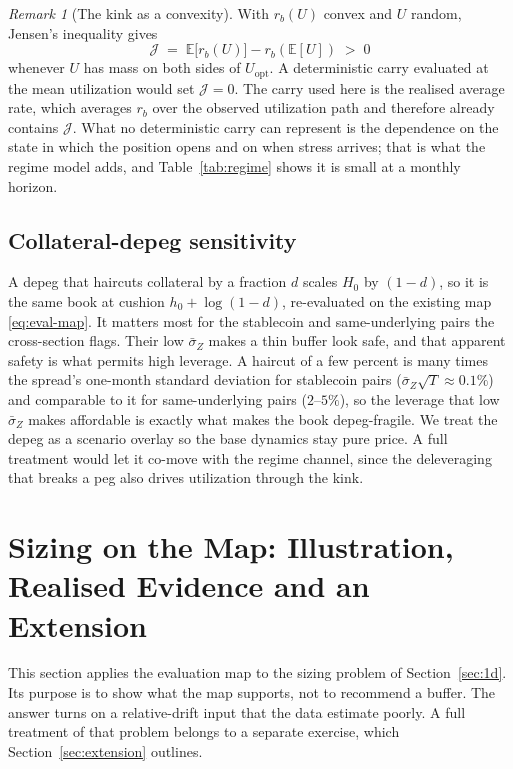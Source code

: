 \documentclass[11pt]{article}
\newcommand{\E}{\mathbb{E}}
\theoremstyle{plain}
\theoremstyle{definition}
\theoremstyle{remark}
\newtheorem{remark}{Remark}
\begin{document}
\begin{remark}[The kink as a convexity]\label{rem:jensen}
With $r_b(U)$ convex and $U$ random, Jensen's inequality gives
\begin{equation}\label{eq:jensen}
\mathcal J\;=\;\E\!\big[r_b(U)\big]-r_b(\E[U])\;>\;0
\end{equation}
whenever $U$ has mass on both sides of $U_{\mathrm{opt}}$. A deterministic carry evaluated at the
mean utilization would set $\mathcal J=0$. The carry used here is the realised average rate, which
averages $r_b$ over the observed utilization path and therefore already contains $\mathcal J$. What
no deterministic carry can represent is the dependence on the state in which the position opens and
on when stress arrives; that is what the regime model adds, and Table~\ref{tab:regime} shows it is
small at a monthly horizon.
\end{remark}

\subsection{Collateral-depeg sensitivity}\label{sec:carry-depeg}
A depeg that haircuts collateral by a fraction $d$ scales $H_0$ by $(1-d)$, so it is the same book at
cushion $h_0+\log(1-d)$, re-evaluated on the existing map \eqref{eq:eval-map}. It matters most for
the stablecoin and same-underlying pairs the cross-section flags. Their low $\bar\sigma_Z$ makes a
thin buffer look safe, and that apparent safety is what permits high leverage. A haircut of a few
percent is many times the spread's one-month standard deviation for stablecoin pairs
($\bar\sigma_Z\sqrt T\approx0.1\%$) and comparable to it for same-underlying pairs ($2$--$5\%$),
so the leverage that low $\bar\sigma_Z$ makes affordable is exactly what makes the book
depeg-fragile. We
treat the depeg as a scenario overlay so the base dynamics stay pure price. A full treatment would let
it co-move with the regime channel, since the deleveraging that breaks a peg also drives utilization
through the kink.

\section{Sizing on the Map: Illustration, Realised Evidence and an Extension}\label{sec:discussion}

This section applies the evaluation map to the sizing problem of Section~\ref{sec:1d}. Its purpose
is to show what the map supports, not to recommend a buffer. The answer turns on a relative-drift
input that the data estimate poorly. A full treatment of that problem belongs to a separate exercise,
which Section~\ref{sec:extension} outlines.
\end{document}
